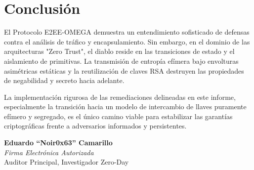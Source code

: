\documentclass[12pt, a4paper]{article}
\begin{document}
\section{Conclusión}
El Protocolo E2EE-OMEGA demuestra un entendimiento sofisticado de defensas contra el análisis de tráfico y encapsulamiento. Sin embargo, en el dominio de las arquitecturas "Zero Trust", el diablo reside en las transiciones de estado y el aislamiento de primitivas. La transmisión de entropía efímera bajo envolturas asimétricas estáticas y la reutilización de claves RSA destruyen las propiedades de negabilidad y secreto hacia adelante.

La implementación rigurosa de las remediaciones delineadas en este informe, especialmente la transición hacia un modelo de intercambio de llaves puramente efímero y segregado, es el único camino viable para estabilizar las garantías criptográficas frente a adversarios informados y persistentes.

\vspace{2cm}
\begin{flushright}
\textbf{Eduardo ``Noir0x63'' Camarillo}\\
\textit{Firma Electrónica Autorizada}\\
Auditor Principal, Investigador Zero-Day
\end{flushright}
\end{document}
